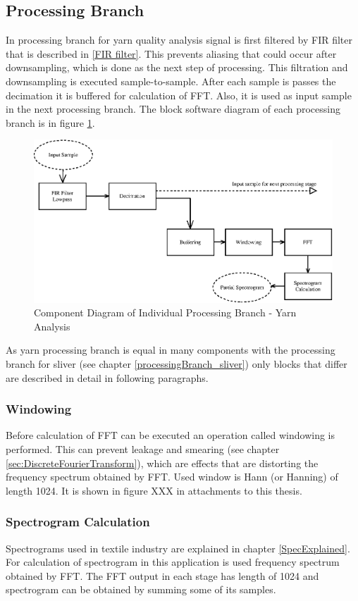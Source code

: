 \documentclass[twoside]{ctuthesis}
\theoremstyle{plain}
\theoremstyle{definition}
\theoremstyle{note}
\begin{document}
\subsection{Processing Branch}
In processing branch for yarn quality analysis signal is first filtered by FIR filter that is described in \ref{FIR filter}. This prevents aliasing that could occur after downsampling, which is done as the next step of processing. This filtration and downsampling is executed sample-to-sample. After each sample is passes the decimation it is buffered for calculation of FFT. Also, it is used as input sample in the next processing branch. The block software diagram of each processing branch is in figure \ref{fig:singleBranch_yarn}.
\begin{figure}[h]
	\centering
	\includegraphics[width=1.0\textwidth]{yarn_singleBranch.eps}
	\caption{Component Diagram of Individual Processing Branch - Yarn Analysis}
	\label{fig:singleBranch_yarn}
\end{figure}

As yarn processing branch is equal in many components with the processing branch for sliver (see chapter \ref{processingBranch_sliver}) only blocks that differ are described in detail in following paragraphs.

\subsubsection{Windowing}
Before calculation of FFT can be executed an operation called windowing is performed. This can prevent leakage and smearing (see chapter \ref{sec:DiscreteFourierTransform}), which are effects that are distorting the frequency spectrum obtained by FFT. Used window is Hann (or Hanning) of length 1024. It is shown in figure XXX in attachments to this thesis.

\subsubsection{Spectrogram Calculation}
Spectrograms used in textile industry are explained in chapter \ref{SpecExplained}. For calculation of spectrogram in this application is used frequency spectrum obtained by FFT. The FFT output in each stage has length of 1024 and spectrogram can be obtained by summing some of its samples. 
\end{document}
